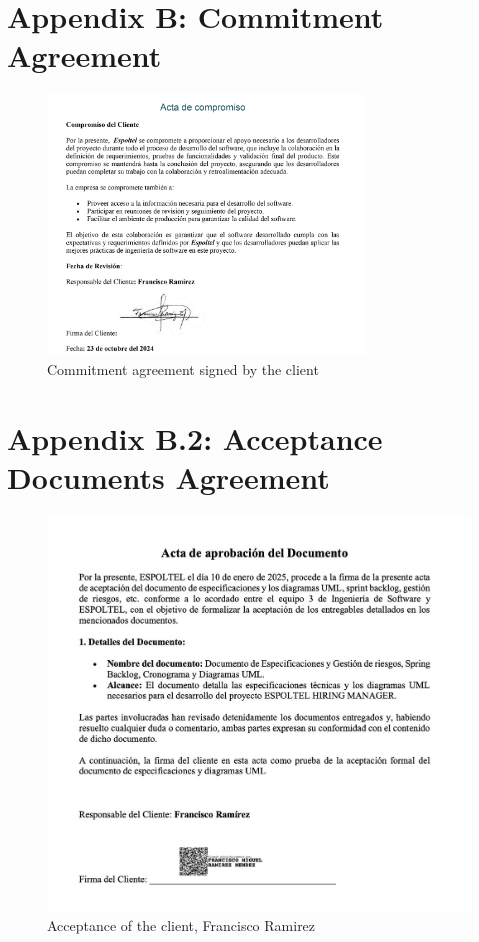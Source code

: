 \documentclass{scrreprt}
\begin{document}
\section{Appendix B: Commitment Agreement}
 \begin{figure}
    \centering \small
    \includegraphics[width=0.75\textwidth]{CommitmentAgreement.jpg}
    \caption{Commitment agreement signed by the client}
    \end{figure}
\FloatBarrier 
\section{Appendix B.2: Acceptance Documents Agreement}
\begin{figure}[H]
	\centering  \small
	\includegraphics[width=\textwidth]{Acceptance.jpeg} 
	\caption{Acceptance of the client, Francisco Ramirez}
	\label{fig:Acceptance}
\end{figure}
\end{document}

